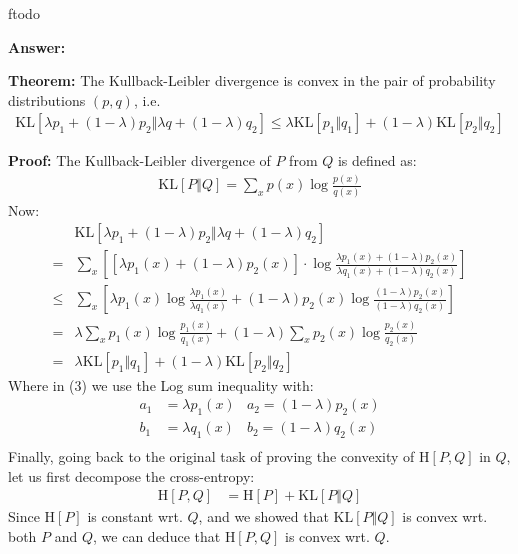 ƒtodo\documentclass{article}
\newenvironment{QandA}{\begin{enumerate}[label=\arabic*.]}{\end{enumerate}}
\newenvironment{InnerQandA}{\begin{enumerate}[label=\roman*.]}{\end{enumerate}}
\newenvironment{answer}{\par\normalfont \textbf{Answer:}}{}
\newenvironment{theorem}{\par\normalfont \textbf{Theorem:}}{}
\newenvironment{proof}{\par\normalfont \textbf{Proof:}}{}
\newcommand{\KL}[2]{\text{KL}\left[#1 \Vert #2 \right]}
\newcommand{\CE}[2]{\text{H}\left[#1, #2 \right]}
\newcommand{\Ent}[1]{\text{H}\left[#1 \right]}
\begin{document}
\begin{QandA}
\begin{InnerQandA}
\begin{answer}
            \begin{theorem}
                The Kullback-Leibler divergence is convex in the pair of probability distributions $(p, q)$, i.e.
                \begin{align*}
                    \KL{\lambda p_1 + (1-\lambda)p_2}{\lambda q + (1-\lambda)q_2} \le \lambda \KL{p_1}{q_1} + (1-\lambda)\KL{p_2}{q_2}
                \end{align*}
            \end{theorem}
            \begin{proof}
                The Kullback-Leibler divergence of $P$ from $Q$ is defined as:
                \begin{align*}
                    \KL{P}{Q} = \sum_{x} p(x) \log \frac{p(x)}{q(x)}
                \end{align*}
                Now:
                \begin{align}
                    &\KL{\lambda p_1 + (1-\lambda)p_2}{\lambda q + (1-\lambda)q_2} \\
                    = &\sum_{x}\left[ \left[\lambda p_1(x) + (1-\lambda)p_2(x)\right] \cdot \log \frac{\lambda p_1(x) + (1-\lambda)p_2(x)}{\lambda q_1(x) + (1-\lambda)q_2(x)} \right] \\
                    \le &\sum_x \left[ \lambda p_1(x) \log \frac{\lambda p_1(x)}{\lambda q_1(x)} + (1 - \lambda) p_2(x) \log \frac{(1-\lambda) p_2(x)}{(1-\lambda) q_2(x)} \right] \\
                    = &\lambda \sum_x p_1(x) \log \frac{ p_1(x)}{q_1(x)} + (1 - \lambda) \sum_x p_2(x) \log \frac{p_2(x)}{q_2(x)}  \\
                    = &\lambda \KL{p_1}{q_1} + (1-\lambda) \KL{p_2}{q_2}
                \end{align}
                Where in (3) we use the Log sum inequality with:
                \begin{align*}
                    a_1 &= \lambda p_1(x) & a_2 = (1-\lambda) p_2(x)\\
                    b_1 &= \lambda q_1(x) & b_2 = (1-\lambda) q_2(x)\\
                \end{align*}
            \end{proof}
        Finally, going back to the original task of proving the convexity of $\CE{P}{Q}$ in $Q$, let us first decompose the cross-entropy:
        \begin{align*}
            \CE{P}{Q} &= \Ent{P} + \KL{P}{Q}
        \end{align*}
        Since $\Ent{P}$ is constant wrt. $Q$, and we showed that $\KL{P}{Q}$ is convex wrt. both $P$ and $Q$, we can deduce that $\CE{P}{Q}$ is convex wrt. $Q$.
        

\end{answer}
\end{InnerQandA}
\end{QandA}
\end{document}
